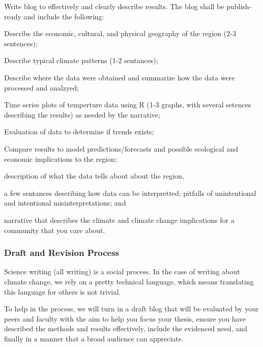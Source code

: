 {Write blog to effectively and clearly describe results. The blog shall be publish-ready and include the following: 

\begin{itemize*}
  \item Describe the economic, cultural, and physical geography of the region (2-3 sentences);
  \item Describe typical climate patterns (1-2 sentances);
  \item Describe where the data were obtained and summarize how the data were processed and analzyed;
  \item Time series plots of temperture data using R (1-3 graphs, with several setences describing the results) as needed by the narrative;
  \item Evaluation of data to determine if trends exists;
  \item Compare results to model predictions/forecasts and possible ecological and economic implications to the region; 
    \item description of what the data tells about about the region, 
  \item a few sentances describing how data can be interpretted; pitfalls of unintentional and intentional misinterpretations; and 
  \item narrative that describes the climate and climate change implications for a community that you care about.
\end{itemize*}

\subsubsection{Draft and Revision Process}

Science writing (all writing) is a social process. In the case of writing about climate change, we rely on a pretty technical language, which means translating this language for others is not trivial. 

To help in the process, we will turn in a draft blog that will be evaluated by your peers and faculty with the aim to help you focus your thesis, ensure you have described the methods and results effectively, include the evidenced need, and finally in a manner that a broad audience can appreciate. 

}
